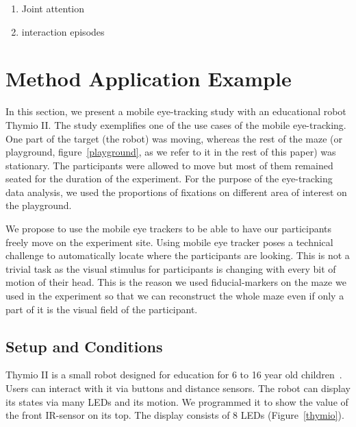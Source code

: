 \documentclass{sig-alternate}
\begin{document}
\begin{enumerate}
\item Joint attention
\item interaction episodes
\end{enumerate}



\section{Method Application Example}
\label{application}

In this section, we present a mobile eye-tracking study with an educational robot Thymio II. The study exemplifies one of the use cases of the mobile eye-tracking. One part of the target (the robot) was moving, whereas the rest of the maze (or playground, figure~\ref{playground}, as we refer to it in the rest of this paper) was stationary. The participants were allowed to move but most of them remained seated for the duration of the experiment. For the purpose of the eye-tracking data analysis, we used the proportions of fixations on different  area of interest on the playground.

We propose to use the mobile eye trackers to be able to have our participants
freely move on the experiment site. Using mobile eye tracker poses a technical
challenge to automatically locate where the participants are looking. This is
not a trivial task as the visual stimulus for participants is changing with
every bit of motion of their head. This is the reason we used fiducial-markers
on the maze we used in the experiment so that we can reconstruct the whole maze
even if only a part of it is the visual field of the participant.

\subsection{Setup and Conditions}

Thymio II is a small robot designed for education for 6 to 16 year old
children~\cite{magnenat2012programming, riedo2012two}. Users can interact with
it via buttons and distance sensors. The robot can display its states via many
LEDs and its motion. We programmed it to show the value of the front IR-sensor
on its top. The display consists of 8 LEDs (Figure~\ref{thymio}).
\end{document}
